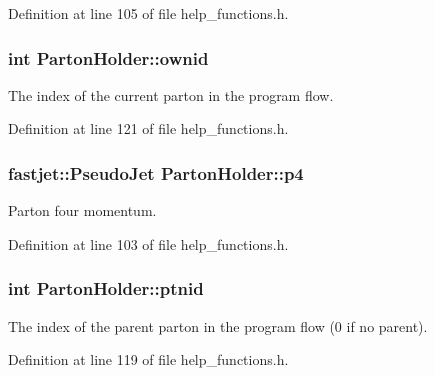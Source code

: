 Definition at line 105 of file help\+\_\+functions.\+h.

\subsubsection[{\texorpdfstring{ownid}{ownid}}]{\setlength{\rightskip}{0pt plus 5cm}int Parton\+Holder\+::ownid}\hypertarget{struct_parton_holder_ada40785510773105d233d9f09efbe7ab}{}\label{struct_parton_holder_ada40785510773105d233d9f09efbe7ab}
The index of the current parton in the program flow. 

Definition at line 121 of file help\+\_\+functions.\+h.

\subsubsection[{\texorpdfstring{p4}{p4}}]{\setlength{\rightskip}{0pt plus 5cm}fastjet\+::\+Pseudo\+Jet Parton\+Holder\+::p4}\hypertarget{struct_parton_holder_a1d8d83542f42beaf5defd588825dc454}{}\label{struct_parton_holder_a1d8d83542f42beaf5defd588825dc454}
Parton four momentum. 

Definition at line 103 of file help\+\_\+functions.\+h.

\subsubsection[{\texorpdfstring{ptnid}{ptnid}}]{\setlength{\rightskip}{0pt plus 5cm}int Parton\+Holder\+::ptnid}\hypertarget{struct_parton_holder_a30bec5ed9a9b4852156edfaad7e44529}{}\label{struct_parton_holder_a30bec5ed9a9b4852156edfaad7e44529}
The index of the parent parton in the program flow (0 if no parent). 

Definition at line 119 of file help\+\_\+functions.\+h.

